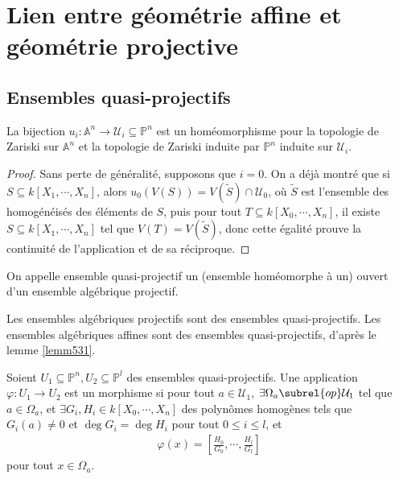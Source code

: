     \section{Lien entre géométrie affine et géométrie projective}
        \subsection{Ensembles quasi-projectifs}
            \begin{lemm}
                \label{lemm531}
                La bijection $u_i : \mathbb{A}^n \to \mathcal{U}_i \subseteq \mathbb{P}^n$ est un homéomorphisme pour la topologie de Zariski sur $\mathbb{A}^n$ et la topologie de Zariski induite par $\mathbb{P}^n$ induite sur $\mathcal{U}_i$.
            \end{lemm}
            \begin{proof}
                Sans perte de généralité, supposons que $i = 0$. On a déjà montré que si $S \subseteq k[X_1, \cdots, X_n]$, alors $u_0(V(S)) = V(\tilde S) \cap \mathcal{U}_0$, où $\tilde S$ est l'ensemble des homogénéisés des éléments de $S$, puis pour tout $T \subseteq k[X_0, \cdots, X_n]$, il existe $S \subseteq k[X_1, \cdots, X_n]$ tel que $V(T) = V(\tilde S)$, donc cette égalité prouve la continuité de l'application et de sa réciproque.
            \end{proof}
            \begin{defi}
                On appelle ensemble quasi-projectif un (ensemble homéomorphe à un) ouvert d'un ensemble algébrique projectif.
            \end{defi}
            \begin{remq}
                Les ensembles algébriques projectifs sont des ensembles quasi-projectifs. Les ensembles algébriques affines sont des ensembles quasi-projectifs, d'après le lemme \ref{lemm531}.
            \end{remq}
            \begin{defi}
                Soient $U_1 \subseteq \mathbb{P}^n, U_2 \subseteq \mathbb{P}^l$ des ensembles quasi-projectifs. Une application $\varphi : U_1 \to U_2$ est un morphisme si pour tout $a \in \mathcal{U}_1$, $\exists \Omega_a \subrel{op} \mathcal{U}_1$ tel que $a \in \Omega_a$, et $\exists G_i, H_i \in k[X_0, \cdots, X_n]$ des polynômes homogènes tels que $G_i(a) \neq 0$ et $\deg G_i = \deg H_i$ pour tout $0 \leq i \leq l$, et
                \begin{align*}
                    \varphi(x) = \left[ \frac{H_0}{G_0}, \cdots, \frac{H_l}{G_l} \right]
                \end{align*}
                pour tout $x \in \Omega_a$.
            \end{defi}
